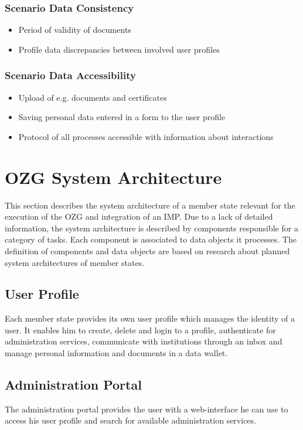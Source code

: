 \documentclass[
     12pt,         %
     a4paper,      %
     BCOR=10mm,version=first,     %
     DIV=14,version=first,        %
     ]{scrreprt}
\begin{document}
\subsubsection{Scenario Data Consistency}
\begin{itemize}
    \item Period of validity of documents
    \item Profile data discrepancies between involved user profiles
\end{itemize}

\subsubsection{Scenario Data Accessibility}
\begin{itemize}
    \item Upload of e.g. documents and certificates
    \item Saving personal data entered in a form to the user profile
    \item Protocol of all processes accessible with information about interactions
\end{itemize}

\section{OZG System Architecture}
This section describes the system architecture of a member state relevant for the execution of the OZG and integration of an IMP. Due to a lack of detailed information, the system architecture is described by components responsible for a category of tasks. Each component is associated to data objects it processes. The definition of components and data objects are based on research about planned system architectures of member states.

\subsection{User Profile}
Each member state provides its own user profile which manages the identity of a user. It enables him to create, delete and login to a profile, authenticate for administration services, communicate with institutions through an inbox and manage personal information and documents in a data wallet.

\subsection{Administration Portal}
The administration portal provides the user with a web-interface he can use to access his user profile and search for available administration services.
\end{document}
